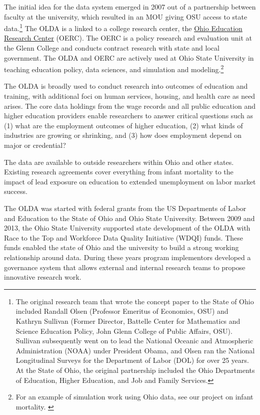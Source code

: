 The initial idea for the data system emerged in 2007 out of a partnership between faculty at the university, which resulted in an MOU giving OSU access to state data.\footnote{The original research team that wrote the concept paper to the State of Ohio included Randall Olsen (Professor Emeritus of Economics, OSU) and Kathryn Sullivan (Former Director, Battelle Center for Mathematics and Science Education Policy, John Glenn College of Public Affairs, OSU). Sullivan subsequently went on to lead the National Oceanic and Atmospheric Administration (NOAA) under President Obama, and Olsen ran the National Longitudinal Surveys for the Department of Labor (DOL) for over 25 years. At the State of Ohio, the original partnership included the Ohio Departments of Education, Higher Education, and Job and Family Services.} The OLDA is a linked to a college research center, the \href{\%5Bwww.oerc.osu.edu\%5D(http://www.oerc.osu.edu/)}{Ohio Education Research Center} (OERC). The OERC is a policy research and evaluation unit at the Glenn College and conducts contract research with state and local government. The OLDA and OERC are actively used at Ohio State University in teaching education policy, data sciences, and simulation and modeling.\footnote{For an example of simulation work using Ohio data, see our project on infant mortality. \citep{hosseinichimeh2017}}

The OLDA is broadly used to conduct research into outcomes of education and training, with additional foci on human services, housing, and health care as need arises. The core data holdings from the wage records and all public education and higher education providers enable researchers to answer critical questions such as (1) what are the employment outcomes of higher education, (2) what kinds of industries are growing or shrinking, and (3) how does employment depend on major or credential?

The data are available to outside researchers within Ohio and other states. Existing research agreements cover everything from infant mortality to the impact of lead exposure on education to extended unemployment on labor market success.

The OLDA was started with federal grants from the US Departments of Labor and Education to the State of Ohio and Ohio State University. Between 2009 and 2013, the Ohio State University supported state development of the OLDA with Race to the Top and Workforce Data Quality Initiative (WDQI) funds. These funds enabled the state of Ohio and the university to build a strong working relationship around data. During these years program implementors developed a governance system that allows external and internal research teams to propose innovative research work.

